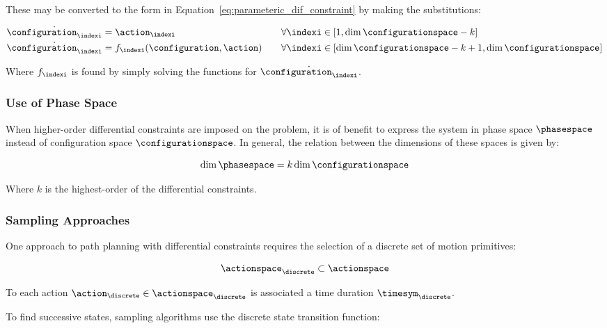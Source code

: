 		These may be converted to the form in
		Equation~\ref{eq:parameteric_dif_constraint} by making the
		substitutions:

		\begin{align}
				\dot{\configuration_{\indexi}} &= \action_{\indexi} 					\quad&&\forall\indexi\in [1, \dim{\configurationspace} - k] \\
				\dot{\configuration_{\indexi}} &= f_{\indexi}(\configuration, \action)	\quad&&\forall\indexi\in [\dim{\configurationspace} - k + 1,\dim\configurationspace]
		\end{align}

		Where $f_{\indexi}$ is found by simply solving the functions for
		$\dot{\configuration_{\indexi}}$.

		\subsubsection{Use of Phase Space}%
		\label{sec:use_of_phase_space}

			When higher-order differential constraints are imposed on the
			problem, it is of benefit to express the system in phase space
			$\phasespace$ instead of configuration space $\configurationspace$.
			In general, the relation between the dimensions of these spaces is
			given by:

			\begin{equation}
				\dim\phasespace = k\dim\configurationspace
			\end{equation}

			Where $k$ is the highest-order of the differential constraints.

		\subsubsection{Sampling Approaches}%
		\label{sec:sampling_approaches}

			One approach to path planning with differential constraints requires
			the selection of a discrete set of motion primitives:

			\begin{equation}
				\actionspace_{\discrete} \subset \actionspace
			\end{equation}

			To each action $\action_{\discrete} \in \actionspace_{\discrete}$ is
			associated a time duration $\timesym_{\discrete}$.

			To find successive states, sampling algorithms use the discrete
			state transition function:

